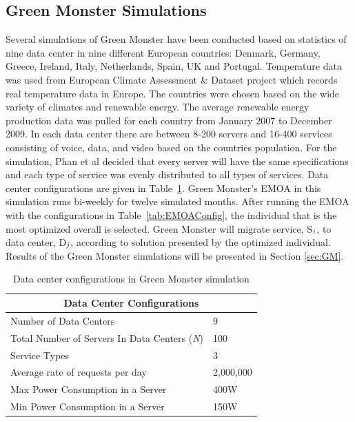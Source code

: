 \documentclass{sig-alternate}
\begin{document}
\subsection{Green Monster Simulations}
\label{sec:GMSims}
 
Several simulations of Green Monster have been conducted based on statistics of nine data center in nine different European countries: Denmark, Germany, Greece, Ireland, Italy, Netherlands, Spain, UK and Portugal. Temperature data was used from European Climate Assessment \& Dataset project which records real temperature data in Europe. The countries were chosen based on the wide variety of climates and renewable energy. The average renewable energy production data was pulled for each country from January 2007 to December 2009. In each data center there are between 8-200 servers and 16-400 services consisting of voice, data, and video based on the countries population. For the simulation, Phan et al decided that every server will have the same specifications and each type of service was evenly distributed to all types of services. Data center configurations are given in Table~\ref{tab:DCConfig}.  Green Monster's EMOA in this simulation runs bi-weekly for twelve simulated months. After running the EMOA with the configurations in Table~\ref{tab:EMOAConfig}, the individual that is the most optimized overall is selected. Green Monster will migrate service, S$_{\text{\emph{i}}}$, to data center, D$_{\text{\emph{j}}}$, according to solution presented by the optimized individual. Results of the Green Monster simulations will be presented in Section \ref{sec:GM}.

\begin{table}[tb]
\begin{center}
\begin{tabular}{|l|l|}
    \hline
    \multicolumn{2}{|c|}{\textbf{Data Center Configurations}} \\
    \hline
    Number of Data Centers & 9 \\
    Total Number of Servers In Data Centers (\emph{N}) & 100 \\
    Service Types & 3 \\
    Average rate of requests per day & 2,000,000 \\
    Max Power Consumption in a Server & 400W \\
   	Min Power Consumption in a Server & 150W\\
    \hline
\end{tabular}
\caption{Data center configurations in Green Monster simulation}
\label{tab:DCConfig}
\end{center}
\end{table}
\end{document}
